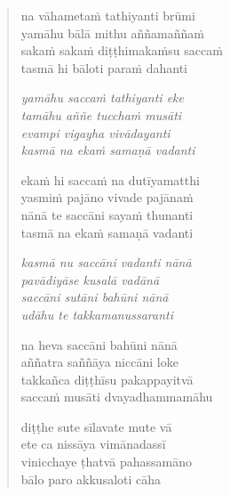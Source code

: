\clearpage
\begin{verse}

na vāhametaṁ tathiyanti brūmi\\
yamāhu bālā mithu aññamaññaṁ\\
sakaṁ sakaṁ diṭṭhimakaṁsu saccaṁ\\
tasmā hi bāloti paraṁ dahanti

\emph{yamāhu saccaṁ tathiyanti eke\\
tamāhu aññe tucchaṁ musāti}\\
\emph{evampi vigayha vivādayanti\\
kasmā na ekaṁ samaṇā vadanti}

ekaṁ hi saccaṁ na dutīyamatthi\\
yasmiṁ pajāno vivade pajānaṁ\\
nānā te saccāni sayaṁ thunanti\\
tasmā na ekaṁ samaṇā vadanti

\emph{kasmā nu saccāni vadanti nānā\\
pavādiyāse kusalā vadānā}\\
\emph{saccāni sutāni bahūni nānā\\
udāhu te takkamanussaranti}

na heva saccāni bahūni nānā\\
aññatra saññāya niccāni loke\\
takkañca diṭṭhīsu pakappayitvā\\
saccaṁ musāti dvayadhammamāhu

diṭṭhe sute sīlavate mute vā\\
ete ca nissāya vimānadassī\\
vinicchaye ṭhatvā pahassamāno\\
bālo paro akkusaloti cāha

\end{verse}


